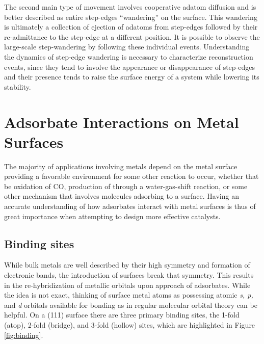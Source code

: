 The second main type of movement involves cooperative adatom diffusion and is
better described as entire step-edges ``wandering'' on the surface. This
wandering is ultimately a collection of ejection of adatoms from step-edges
followed by their re-admittance to the step-edge at a different position. It is
possible to observe the large-scale step-wandering by following these
individual events. Understanding the dynamics of step-edge wandering is
necessary to characterize reconstruction events, since they tend to involve the
appearance or disappearance of step-edges and their presence tends to raise the
surface energy of a system while lowering its stability.

\section{Adsorbate Interactions on Metal Surfaces}
The majority of applications involving metals depend on the metal
surface providing a favorable environment for some other reaction to occur,
whether that be oxidation of CO, production of  through a
water-gas-shift reaction, or some other mechanism that involves molecules
adsorbing to a surface. Having an accurate understanding of how adsorbates
interact with metal surfaces is thus of great importance when attempting
to design more effective catalysts.

\subsection{Binding sites}
While bulk metals are well described by their high symmetry and formation of
electronic bands, the introduction of surfaces break that symmetry. This results in the re-hybridization of
metallic orbitals upon approach of adsorbates. While the idea is not
exact, thinking of surface metal atoms as possessing atomic {\em s, p, } and {\em d}
orbitals available for bonding as in regular molecular orbital theory can be
helpful. On a (111) surface there are three primary binding sites, the 1-fold
(atop), 2-fold (bridge), and 3-fold (hollow) sites, which are highlighted in
Figure \ref{fig:binding}. 

